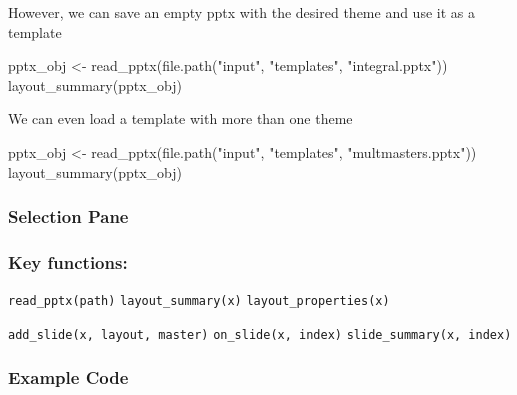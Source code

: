 \documentclass[
]{book}
\newenvironment{Shaded}{\begin{snugshade}}{\end{snugshade}}
\newcommand{\FunctionTok}[1]{\textcolor[rgb]{0.00,0.00,0.00}{#1}}
\newcommand{\NormalTok}[1]{#1}
\newcommand{\OtherTok}[1]{\textcolor[rgb]{0.56,0.35,0.01}{#1}}
\newcommand{\StringTok}[1]{\textcolor[rgb]{0.31,0.60,0.02}{#1}}
\begin{document}
However, we can save an empty pptx with the desired theme and use it as a template

\begin{Shaded}
\begin{Highlighting}[]
\NormalTok{pptx\_obj }\OtherTok{\textless{}{-}} \FunctionTok{read\_pptx}\NormalTok{(}\FunctionTok{file.path}\NormalTok{(}\StringTok{"input"}\NormalTok{, }\StringTok{"templates"}\NormalTok{, }\StringTok{"integral.pptx"}\NormalTok{))}
\FunctionTok{layout\_summary}\NormalTok{(pptx\_obj)}
\end{Highlighting}
\end{Shaded}

We can even load a template with more than one theme

\begin{Shaded}
\begin{Highlighting}[]
\NormalTok{pptx\_obj }\OtherTok{\textless{}{-}} \FunctionTok{read\_pptx}\NormalTok{(}\FunctionTok{file.path}\NormalTok{(}\StringTok{"input"}\NormalTok{, }\StringTok{"templates"}\NormalTok{, }\StringTok{"multmasters.pptx"}\NormalTok{))}
\FunctionTok{layout\_summary}\NormalTok{(pptx\_obj)}
\end{Highlighting}
\end{Shaded}

\hypertarget{selection-pane}{%
\subsubsection{Selection Pane}\label{selection-pane}}

\hypertarget{key-functions}{%
\subsubsection{Key functions:}\label{key-functions}}

\texttt{read\_pptx(path)} \texttt{layout\_summary(x)} \texttt{layout\_properties(x)}

\texttt{add\_slide(x,\ layout,\ master)} \texttt{on\_slide(x,\ index)} \texttt{slide\_summary(x,\ index)}

\hypertarget{example-code}{%
\subsubsection{Example Code}\label{example-code}}
\end{document}
